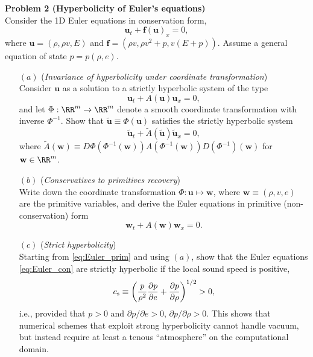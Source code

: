 \documentclass[letter,11pt]{article}
\begin{document}
{\noindent\large\textbf{Problem 2 (Hyperbolicity of Euler's equations)}}\\ %

\noindent Consider the 1D Euler equations in conservation form,
\begin{equation}
    \mathbf{u}_t + \mathbf{f}(\mathbf{u})_x = 0, \label{eq:Euler_con}
\end{equation}
where $\mathbf{u} = (\rho, \rho v, E)$ and $\mathbf{f} = (\rho v, \rho v^2 + p, v(E+p))$. Assume a general equation of state $p = p(\rho,e)$.

\begin{itemize}
  \item[$(a)$] (\emph{Invariance of hyperbolicity under coordinate transformation}) \\
  Consider $\mathbf{u}$ as a solution to a strictly hyperbolic system of the type
  \begin{equation}
    \mathbf{u}_t + A(\mathbf{u})\mathbf{u}_x = 0,
  \end{equation}
  and let $\Phi: \RR^m \rightarrow \RR^m$ denote a smooth coordinate transformation with inverse $\Phi^{-1}$. Show that $\tilde{\mathbf{u}}\equiv \Phi(\mathbf{u})$ satisfies the strictly hyperbolic system
  \begin{equation}
    \tilde{\mathbf{u}}_t + \tilde{A}(\tilde{\mathbf{u}})\tilde{\mathbf{u}}_x = 0,
  \end{equation}
  where $\tilde{A}(\mathbf{w})\equiv D\Phi(\Phi^{-1}(\mathbf{w}))A(\Phi^{-1}(\mathbf{w}))D(\Phi^{-1})(\mathbf{w})$ for $\mathbf{w}\in \RR^m$.

  \item[$(b)$] (\emph{Conservatives to primitives recovery})\\
    Write down the coordinate transformation $\Phi: \mathbf{u}\mapsto \mathbf{w}$, where $\mathbf{w}\equiv (\rho,v,e)$ are the primitive variables, and derive the Euler equations in primitive (non-conservation) form
    \begin{equation}
      \mathbf{w}_t + A(\mathbf{w})\mathbf{w}_x = 0. \label{eq:Euler_prim}
    \end{equation}

  \item[$(c)$] (\emph{Strict hyperbolicity})\\
  Starting from \eqref{eq:Euler_prim} and using $(a)$, show that the Euler equations \eqref{eq:Euler_con} are strictly hyperbolic if the local sound speed is positive,
    \begin{equation}
      c_{\rm s} \equiv \left(\frac{p}{\rho^2}\frac{\partial p}{\partial e} + \frac{\partial p}{\partial\rho}\right)^{1/2} > 0,
    \end{equation}
    i.e., provided that $p>0$ and $\partial p/\partial e > 0$, $\partial p/\partial\rho > 0$. This shows that numerical schemes that exploit strong hyperbolicity cannot handle vacuum, but instead require at least a tenous ``atmosphere'' on the computational domain.
\end{itemize}
\end{document}
